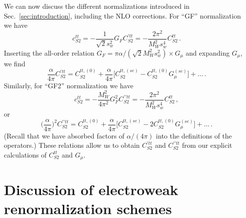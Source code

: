 \documentclass[letter,11pt,DIV=12,abstract=true,numbers=noenddot,titlepage=false,twocolumn=false,draft=false]{scrartcl}
\begin{document}
We can now discuss the different normalizations introduced in
Sec.~\ref{sec:introduction}, including the NLO corrections. For ``GF''
normalization we have
\begin{equation}
  c_{S2}^{tt} = - \frac{1}{\sqrt{2} s_w^2} G_F C_{S2}^{\prime tt}
            = - \frac{2\pi^2}{M_W^2 s_w^4} C_{S2}^{tt} \,.
\end{equation}
Inserting the all-order relation $G_F = \pi\alpha/(\sqrt{2}M_W^2s_w^2)
\times G_\mu$ and expanding $G_\mu$, we find
\begin{equation}
  \frac{\alpha}{4\pi} C_{S2}^{\prime tt}
=   C_{S2}^{tt,(0)}
  + \frac{\alpha}{4\pi} 
    \bigg[   C_{S2}^{tt,(se)}
           - C_{S2}^{tt,(0)} G_\mu^{(se)} \bigg]
  + \ldots \,.
\end{equation}
Similarly, for ``GF2'' normalization we have
\begin{equation}
  c_{S2}^{tt} = - \frac{M_W^2}{4\pi^2} G_F^2 C_{S2}^{\prime \prime tt}
            = - \frac{2\pi^2}{M_W^2 s_w^4} C_{S2}^{tt} \,,
\end{equation}
or 
\begin{equation}
  \bigg(\frac{\alpha}{4\pi}\bigg)^2 C_{S2}^{\prime \prime tt}
=   C_{S2}^{tt,(0)}
  + \frac{\alpha}{4\pi} 
    \bigg[   C_{S2}^{tt,(se)}
           - 2 C_{S2}^{tt,(0)} G_\mu^{(se)} \bigg]
  + \ldots \,.
\end{equation}
(Recall that we have absorbed factors of $\alpha/(4\pi)$ into the
definitions of the operators.) These relations allow us to obtain
$C_{S2}^{\prime tt}$ and $C_{S2}^{\prime \prime tt}$ from our explicit
calculations of $C_{S2}^{tt}$ and $G_\mu$.





\section{Discussion of electroweak renormalization schemes}\label{sec:ew}
\end{document}
